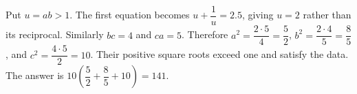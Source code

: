 Put $u=ab>1$. The first equation becomes $u+\dfrac{1}{u}=2.5$, giving $u=2$ rather than its reciprocal. Similarly $bc=4$ and $ca=5$. Therefore $a^2=\dfrac{2\cdot5}{4}=\dfrac{5}{2}$, $b^2=\dfrac{2\cdot4}{5}=\dfrac{8}{5}$, and $c^2=\dfrac{4\cdot5}{2}=10$. Their positive square roots exceed one and satisfy the data. The answer is $10(\dfrac{5}{2}+\dfrac{8}{5}+10)=\boxed{141}$.
